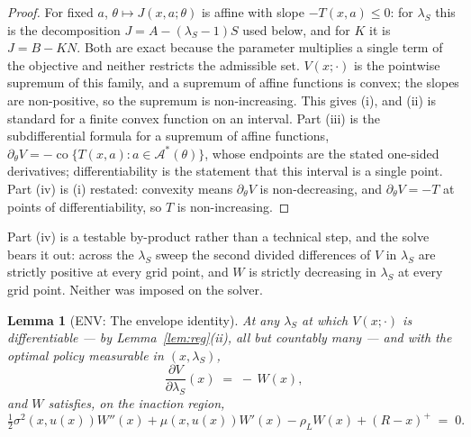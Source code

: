 \documentclass[11pt]{article}
\newtheorem{lemma}{Lemma}
\theoremstyle{remark}
\begin{document}
\begin{proof}
For fixed $a$, $\theta \mapsto J(x,a;\theta)$ is affine with slope
$-T(x,a) \le 0$: for $\lambda_S$ this is the decomposition
$J = A - (\lambda_S-1)S$ used below, and for $K$ it is $J = B - KN$. Both
are exact because the parameter multiplies a single term of the objective
and neither restricts the admissible set. $V(x;\cdot)$ is the pointwise
supremum of this family, and a supremum of affine functions is convex; the
slopes are non-positive, so the supremum is non-increasing. This gives
(i), and (ii) is standard for a finite convex function on an interval.
Part (iii) is the subdifferential formula for a supremum of affine
functions, $\partial_\theta V = -\operatorname{co}\{T(x,a) : a \in
\mathcal{A}^*(\theta)\}$, whose endpoints are the stated one-sided
derivatives; differentiability is the statement that this interval is a
single point. Part (iv) is (i) restated: convexity means
$\partial_\theta V$ is non-decreasing, and $\partial_\theta V = -T$ at
points of differentiability, so $T$ is non-increasing.
\end{proof}

\noindent
Part (iv) is a testable by-product rather than a technical step, and the
solve bears it out: across the $\lambda_S$ sweep the second divided
differences of $V$ in $\lambda_S$ are strictly positive at every grid
point, and $W$ is strictly decreasing in $\lambda_S$ at every grid point.
Neither was imposed on the solver.

\begin{lemma}[ENV: The envelope identity]
\label{lem:envelope}
At any $\lambda_S$ at which $V(x;\cdot)$ is differentiable --- by
Lemma~\ref{lem:reg}(ii), all but countably many --- and with the optimal
policy measurable in $(x,\lambda_S)$,
\begin{equation}
\frac{\partial V}{\partial \lambda_S}(x) \;=\; -\,W(x),
\label{eq:envelope}
\end{equation}
and $W$ satisfies, on the inaction region,
\begin{equation}
\tfrac12\sigma^2(x,u(x))W''(x) + \mu(x,u(x))W'(x) - \rho_L W(x)
  + (R-x)^+ \;=\; 0 .
\label{eq:Wode}
\end{equation}
\end{lemma}
\end{document}
